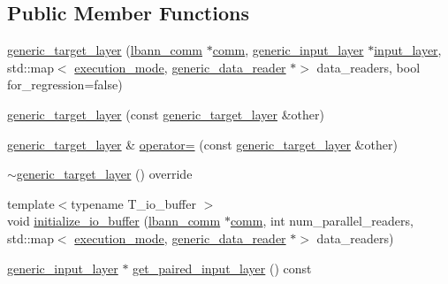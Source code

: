 \subsection*{Public Member Functions}
\begin{DoxyCompactItemize}
\item 
\hyperlink{classlbann_1_1generic__target__layer_a9b82afdbd6bb2671b0fde30c0116ada5}{generic\+\_\+target\+\_\+layer} (\hyperlink{classlbann_1_1lbann__comm}{lbann\+\_\+comm} $\ast$\hyperlink{file__io_8cpp_ab048c6f9fcbcfaa57ce68b00263dbebe}{comm}, \hyperlink{classlbann_1_1generic__input__layer}{generic\+\_\+input\+\_\+layer} $\ast$\hyperlink{classlbann_1_1input__layer}{input\+\_\+layer}, std\+::map$<$ \hyperlink{base_8hpp_a2781a159088df64ed7d47cc91c4dc0a8}{execution\+\_\+mode}, \hyperlink{classlbann_1_1generic__data__reader}{generic\+\_\+data\+\_\+reader} $\ast$$>$ data\+\_\+readers, bool for\+\_\+regression=false)
\item 
\hyperlink{classlbann_1_1generic__target__layer_a72f03053d39d371281339ae57e85f9aa}{generic\+\_\+target\+\_\+layer} (const \hyperlink{classlbann_1_1generic__target__layer}{generic\+\_\+target\+\_\+layer} \&other)
\item 
\hyperlink{classlbann_1_1generic__target__layer}{generic\+\_\+target\+\_\+layer} \& \hyperlink{classlbann_1_1generic__target__layer_a7c15e3fe4f1fd7f0ccdbc4c3ed8c793e}{operator=} (const \hyperlink{classlbann_1_1generic__target__layer}{generic\+\_\+target\+\_\+layer} \&other)
\item 
\hyperlink{classlbann_1_1generic__target__layer_a899373681fe6ede57383da34fe4156c1}{$\sim$generic\+\_\+target\+\_\+layer} () override
\item 
{\footnotesize template$<$typename T\+\_\+io\+\_\+buffer $>$ }\\void \hyperlink{classlbann_1_1generic__target__layer_a46f2192139bd8cec23a20e1c9b67869d}{initialize\+\_\+io\+\_\+buffer} (\hyperlink{classlbann_1_1lbann__comm}{lbann\+\_\+comm} $\ast$\hyperlink{file__io_8cpp_ab048c6f9fcbcfaa57ce68b00263dbebe}{comm}, int num\+\_\+parallel\+\_\+readers, std\+::map$<$ \hyperlink{base_8hpp_a2781a159088df64ed7d47cc91c4dc0a8}{execution\+\_\+mode}, \hyperlink{classlbann_1_1generic__data__reader}{generic\+\_\+data\+\_\+reader} $\ast$$>$ data\+\_\+readers)
\item 
\hyperlink{classlbann_1_1generic__input__layer}{generic\+\_\+input\+\_\+layer} $\ast$ \hyperlink{classlbann_1_1generic__target__layer_a4ffc26f13661686fdf7f8482beef79d4}{get\+\_\+paired\+\_\+input\+\_\+layer} () const
\item 

\end{DoxyCompactItemize}
